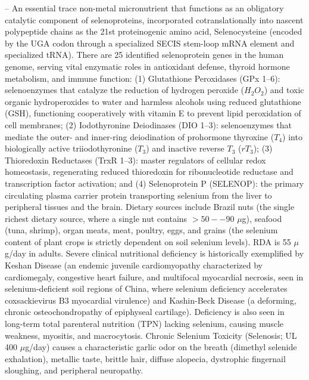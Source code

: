 -- An essential trace non-metal micronutrient that functions as an obligatory catalytic component of selenoproteins, incorporated cotranslationally into nascent polypeptide chains as the 21st proteinogenic amino acid, Selenocysteine (encoded by the UGA codon through a specialized SECIS stem-loop mRNA element and specialized tRNA). There are 25 identified selenoprotein genes in the human genome, serving vital enzymatic roles in antioxidant defense, thyroid hormone metabolism, and immune function: (1) Glutathione Peroxidases (GPx 1--6): selenoenzymes that catalyze the reduction of hydrogen peroxide ($H_2O_2$) and toxic organic hydroperoxides to water and harmless alcohols using reduced glutathione (GSH), functioning cooperatively with vitamin E to prevent lipid peroxidation of cell membranes; (2) Iodothyronine Deiodinases (DIO 1--3): selenoenzymes that mediate the outer- and inner-ring deiodination of prohormone thyroxine ($T_4$) into biologically active triiodothyronine ($T_3$) and inactive reverse $T_3$ ($rT_3$); (3) Thioredoxin Reductases (TrxR 1--3): master regulators of cellular redox homeostasis, regenerating reduced thioredoxin for ribonucleotide reductase and transcription factor activation; and (4) Selenoprotein P (SELENOP): the primary circulating plasma carrier protein transporting selenium from the liver to peripheral tissues and the brain. Dietary sources include Brazil nuts (the single richest dietary source, where a single nut contains $>50--90$ $\mu$g), seafood (tuna, shrimp), organ meats, meat, poultry, eggs, and grains (the selenium content of plant crops is strictly dependent on soil selenium levels). RDA is 55 $\mu$g/day in adults. Severe clinical nutritional deficiency is historically exemplified by Keshan Disease (an endemic juvenile cardiomyopathy characterized by cardiomegaly, congestive heart failure, and multifocal myocardial necrosis, seen in selenium-deficient soil regions of China, where selenium deficiency accelerates coxsackievirus B3 myocardial virulence) and Kashin-Beck Disease (a deforming, chronic osteochondropathy of epiphyseal cartilage). Deficiency is also seen in long-term total parenteral nutrition (TPN) lacking selenium, causing muscle weakness, myositis, and macrocytosis. Chronic Selenium Toxicity (Selenosis; UL 400 $\mu$g/day) causes a characteristic garlic odor on the breath (dimethyl selenide exhalation), metallic taste, brittle hair, diffuse alopecia, dystrophic fingernail sloughing, and peripheral neuropathy.

